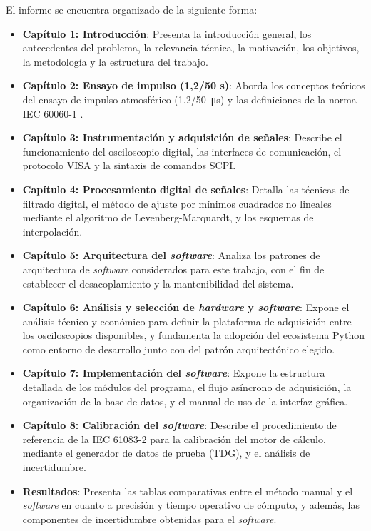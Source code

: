 El informe se encuentra organizado de la siguiente forma:

\begin{itemize}
    \item \textbf{Capítulo 1: Introducción}: Presenta la introducción general, los antecedentes del problema, la relevancia técnica, la motivación, los objetivos, la metodología y la estructura del trabajo.
    \item \textbf{Capítulo 2: Ensayo de impulso (1,2/50 \textmu s)}: Aborda los conceptos teóricos del ensayo de impulso atmosférico (\qty[parse-numbers=false]{1.2/50}{\micro\second}) y las definiciones de la norma IEC 60060-1 \cite{iec60060_1}.
    \item \textbf{Capítulo 3: Instrumentación y adquisición de señales}: Describe el funcionamiento del osciloscopio digital, las interfaces de comunicación, el protocolo VISA y la sintaxis de comandos SCPI.
    \item \textbf{Capítulo 4: Procesamiento digital de señales}: Detalla las técnicas de filtrado digital, el método de ajuste por mínimos cuadrados no lineales mediante el algoritmo de Levenberg-Marquardt, y los esquemas de interpolación.
    \item \textbf{Capítulo 5: Arquitectura del \emph{software}}: Analiza los patrones de arquitectura de \emph{software} considerados para este trabajo, con el fin de establecer el desacoplamiento y la mantenibilidad del sistema.
    \item \textbf{Capítulo 6: Análisis y selección de \emph{hardware} y \emph{software}}: Expone el análisis técnico y económico para definir la plataforma de adquisición entre los osciloscopios disponibles, y fundamenta la adopción del ecosistema Python como entorno de desarrollo junto con del patrón arquitectónico elegido.
    \item \textbf{Capítulo 7: Implementación del \emph{software}}: Expone la estructura detallada de los módulos del programa, el flujo asíncrono de adquisición, la organización de la base de datos, y el manual de uso de la interfaz gráfica.
    \item \textbf{Capítulo 8: Calibración del \emph{software}}: Describe el procedimiento de referencia de la IEC 61083-2 \cite{iec61083_2} para la calibración del motor de cálculo, mediante el generador de datos de prueba (TDG), y el análisis de incertidumbre.
    \item \textbf{Resultados}: Presenta las tablas comparativas entre el método manual y el \emph{software} en cuanto a precisión y tiempo operativo de cómputo, y además, las componentes de incertidumbre obtenidas para el \emph{software}.

\end{itemize}
